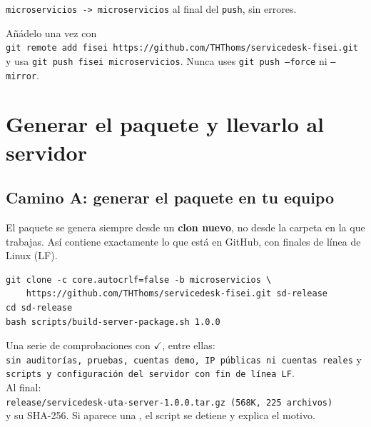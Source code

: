 \documentclass[11pt,a4paper,oneside]{report}
\newcommand{\cod}[1]{\texttt{\small #1}}
\newcommand{\donde}[1]{\par\smallskip\noindent{\small\sffamily\bfseries\color{white}\colorbox{utaRojo}{\,#1\,}}\par\nopagebreak\vspace{-2pt}}
\newcommand{\equipo}{\donde{EN TU EQUIPO}}
\begin{document}
\begin{esperado}
\cod{microservicios -> microservicios} al final del \cod{push}, sin errores.
\end{esperado}

\begin{nota}
Añádelo una vez con\\
\cod{git remote add fisei https://github.com/THThoms/servicedesk-fisei.git}\\
y usa \cod{git push fisei microservicios}. Nunca uses \cod{git push --force} ni \cod{--mirror}.
\end{nota}

\chapter{Generar el paquete y llevarlo al servidor}\label{cap:paquete}

\section{Camino A: generar el paquete en tu equipo}\label{sec:caminoA}
El paquete se genera siempre desde un \textbf{clon nuevo}, no desde la carpeta en la que trabajas.
Así contiene exactamente lo que está en GitHub, con finales de línea de Linux (LF).

\equipo
\begin{lstlisting}
git clone -c core.autocrlf=false -b microservicios \
    https://github.com/THThoms/servicedesk-fisei.git sd-release
cd sd-release
bash scripts/build-server-package.sh 1.0.0
\end{lstlisting}

\begin{esperado}
Una serie de comprobaciones con \textcolor{verde}{$\checkmark$}, entre ellas:\\
\cod{sin auditorías, pruebas, cuentas demo, IP públicas ni cuentas reales} y\\
\cod{scripts y configuración del servidor con fin de línea LF}.\\
Al final:\\
\cod{release/servicedesk-uta-server-1.0.0.tar.gz (568K, 225 archivos)}\\
y su SHA-256. Si aparece una \textcolor{red}{\ding{55}}, el script se detiene y explica el motivo.
\end{esperado}
\end{document}
